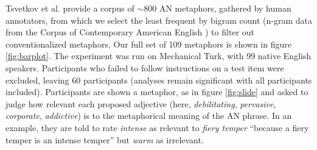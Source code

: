 \documentclass[9pt,twocolumn,twoside,lineno]{pnas-new}
\begin{document}
{		
		Tsvetkov et al. \cite{tsvetkov2014metaphor} provide a corpus of $\sim$800 AN metaphors, gathered by human annotators, from which we select the least frequent by bigram count (n-gram data from the Corpus of Contemporary American English \cite{davies2011word}) to filter out conventionalized metaphors. Our full set of 109 metaphors is shown in figure \ref{fig:barplot}.
		The experiment was run on Mechanical Turk, with 99 native English speakers. Participants who failed to follow instructions on a test item were excluded, leaving 60 participants (analyses remain significant with all participants included).
		Participants are shown a metaphor, as in figure \ref{fig:slide} and asked to judge how relevant each proposed adjective (here, \emph{debilitating}, \emph{pervasive}, \emph{corporate}, \emph{addictive}) is to the metaphorical meaning of the AN phrase. In an example, they are told to rate \emph{intense} as relevant to \emph{fiery temper} ``because a fiery temper is an intense temper'' but \emph{warm} as irrelevant.

}

\showmatmethods{} %




\end{document}

